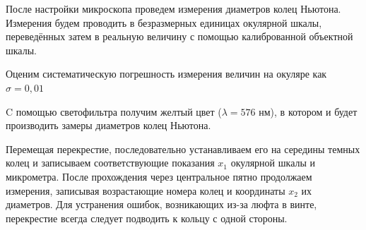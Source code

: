 \documentclass[a4paper,12pt]{report}
\begin{document}
После настройки микроскопа проведем измерения диаметров колец Ньютона. Измерения будем проводить в безразмерных единицах окулярной шкалы, переведённых затем в реальную величину с помощью калиброванной объектной шкалы. 
	
	
	Оценим систематическую погрешность измерения величин на окуляре как $ \sigma = 0,01 $ 
	
	C помощью светофильтра получим желтый цвет ($ \lambda = 576 $ нм), в котором и будет производить замеры диаметров колец Ньютона.
	
	Перемещая перекрестие, последовательно устанавливаем его на середины темных колец и записываем соответствующие показания $x_1$ окулярной шкалы и микрометра. После прохождения через центральное пятно продолжаем измерения, записывая возрастающие номера колец и координаты $x_2$ их диаметров. Для устранения ошибок, возникающих из-за люфта в винте, перекрестие всегда следует подводить к кольцу с одной стороны.
\end{document}
